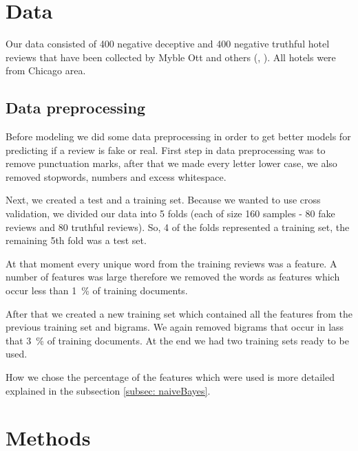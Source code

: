 \documentclass[a4paper,11pt]{article}
\begin{document}
\section{Data}
\label{sec: data}
Our data consisted of 400 negative deceptive and 400 negative truthful hotel reviews that have been collected by Myble Ott and others (\cite{article2}, \cite{article1}). All hotels were from Chicago area.

\subsection{Data preprocessing}
Before modeling we did some data preprocessing in order to get better models for predicting if a review is fake or real. First step in data preprocessing was to remove punctuation marks, after that we made every letter lower case, we also removed stopwords, numbers and excess whitespace. 

Next, we created a test and a training set. Because we wanted to use cross validation, we divided our data into 5 folds (each of size 160 samples - 80 fake reviews and 80 truthful reviews). So, 4 of the folds represented a training set, the remaining 5th fold was a test set. 

At that moment every unique word from the training reviews was a feature.  A number of features was large therefore we removed the words as features which occur less than 1~\% of training documents.

After that we created a new training set which contained all the features from the previous training set and bigrams. We again removed bigrams that occur in lass that  3~\% of training documents. At the end we had two training sets ready to be used. 

How we chose the percentage of the features which were used is more detailed explained in the subsection \ref{subsec: naiveBayes}.

\section{Methods}
\label{sec: methods}
\end{document}
